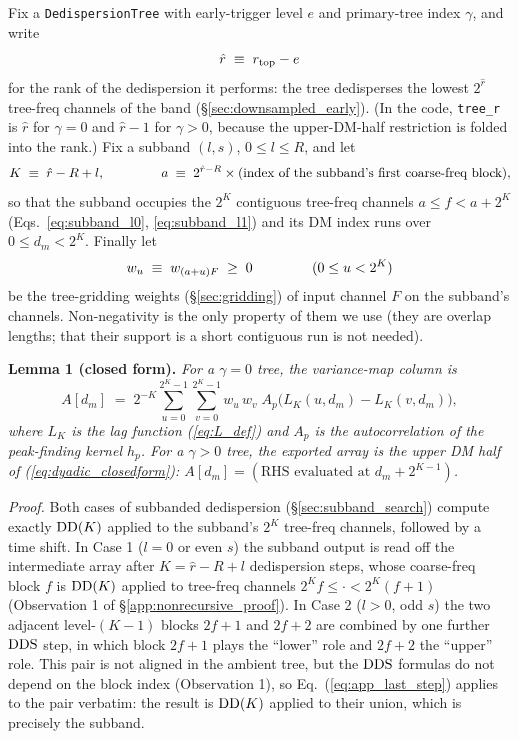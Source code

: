 \documentclass{article}
\numberwithin{equation}{section}   %
\def\DDS{{\rm DDS}}
\def\DD{{\rm DD}}
\begin{document}
Fix a {\tt DedispersionTree} with early-trigger level $e$ and primary-tree index $\gamma$,
and write
\begin{equation}
\hat r \;\equiv\; r_{\rm top} - e
\end{equation}
for the rank of the dedispersion it performs: the tree dedisperses the lowest $2^{\hat r}$
tree-freq channels of the band (\S\ref{sec:downsampled_early}). (In the code, {\tt tree\_r}
is $\hat r$ for $\gamma = 0$ and $\hat r - 1$ for $\gamma > 0$, because the upper-DM-half
restriction is folded into the rank.) Fix a subband $(l,s)$, $0 \le l \le R$, and let
\begin{equation}
K \;\equiv\; \hat r - R + l,
  \hspace{1.5cm}
a \;\equiv\; 2^{\hat r - R} \times (\mbox{index of the subband's first coarse-freq block}),
\end{equation}
so that the subband occupies the $2^K$ contiguous tree-freq channels $a \le f < a+2^K$
(Eqs.\ \ref{eq:subband_l0}, \ref{eq:subband_l1}) and its DM index runs over
$0 \le d_m < 2^K$. Finally let
\begin{equation}
w_u \;\equiv\; w_{(a+u)F} \;\ge\; 0
  \hspace{1.5cm} (0 \le u < 2^K)
\end{equation}
be the tree-gridding weights (\S\ref{sec:gridding}) of input channel $F$ on the subband's
channels. Non-negativity is the only property of them we use (they are overlap lengths; that
their support is a short contiguous run is not needed).

\medskip
\par\noindent
{\bf Lemma 1 (closed form).}
{\em For a $\gamma=0$ tree, the variance-map column is}
\begin{equation}
A[d_m] \;=\; 2^{-K} \sum_{u=0}^{2^K-1} \sum_{v=0}^{2^K-1}
   w_u \, w_v \; A_p\big( L_K(u,d_m) - L_K(v,d_m) \big),
\label{eq:dyadic_closedform}
\end{equation}
{\em where $L_K$ is the lag function (\ref{eq:L_def}) and $A_p$ is the autocorrelation of the
peak-finding kernel $h_p$. For a $\gamma>0$ tree, the exported array is the upper DM half of
(\ref{eq:dyadic_closedform}): $A[d_m] = (\mbox{RHS evaluated at } d_m + 2^{K-1})$.}

\medskip
\par\noindent
{\em Proof.} Both cases of subbanded dedispersion (\S\ref{sec:subband_search}) compute
exactly $\DD(K)$ applied to the subband's $2^K$ tree-freq channels, followed by a time shift.
In Case 1 ($l=0$ or even $s$) the subband output is read off the intermediate array after
$K = \hat r - R + l$ dedispersion steps, whose coarse-freq block $f$ is $\DD(K)$ applied to
tree-freq channels $2^K f \le \cdot < 2^K (f+1)$ (Observation 1 of
\S\ref{app:nonrecursive_proof}). In Case 2 ($l>0$, odd $s$) the two adjacent level-$(K-1)$
blocks $2f+1$ and $2f+2$ are combined by one further $\DDS$ step, in which block $2f+1$ plays
the ``lower'' role and $2f+2$ the ``upper'' role. This pair is not aligned in the ambient
tree, but the $\DDS$ formulas do not depend on the block index (Observation 1), so
Eq.\ (\ref{eq:app_last_step}) applies to the pair verbatim: the result is $\DD(K)$ applied to
their union, which is precisely the subband.
\end{document}
